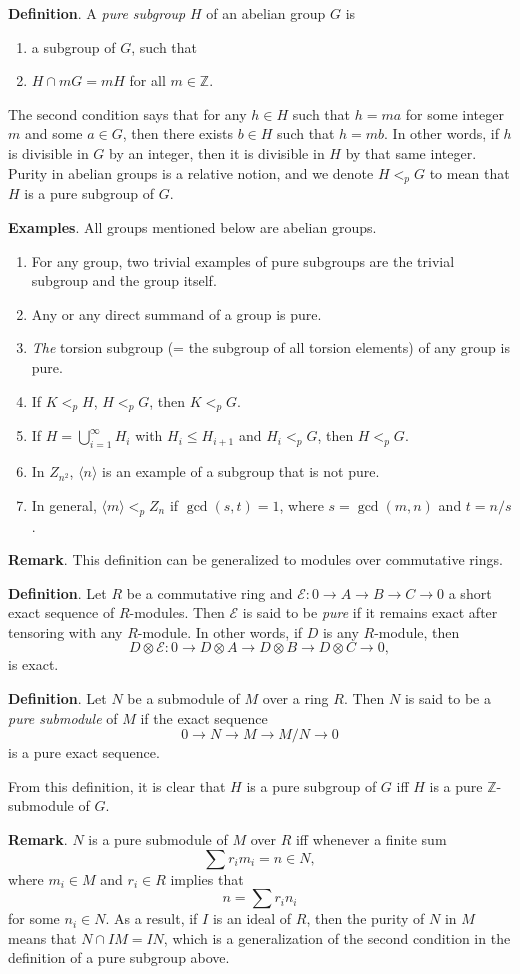 \documentclass[12pt]{article}
\begin{document}
\textbf{Definition}.  A \emph{pure subgroup} $H$ of an abelian group
$G$ is
\begin{enumerate}
\item a subgroup of $G$, such that
\item $H\cap mG=mH$ for all $m\in\mathbb{Z}$.
\end{enumerate}
The second condition says that for any $h\in H$ such that $h=ma$ for
some integer $m$ and some $a\in G$, then there exists $b\in H$ such
that $h=mb$.  In other words, if $h$ is divisible in $G$ by an
integer, then it is divisible in $H$ by that same integer.  Purity in
abelian groups is a relative notion, and we denote $H<_pG$ to mean
that $H$ is a pure subgroup of $G$.
\par
\textbf{Examples}.  All groups mentioned below are abelian groups.
\begin{enumerate}
\item For any group, two trivial examples of pure subgroups are the trivial
subgroup and the group itself.
\item Any  or any direct summand of a group is pure.
\item \textit{The} torsion subgroup (= the subgroup of all torsion elements) of any group is pure.
\item If $K<_pH$, $H<_pG$, then $K<_pG$.
\item If $H=\bigcup_{i=1}^{\infty}H_i$ with $H_i\leq H_{i+1}$ and
$H_i<_pG$, then $H<_pG$.
\item In $Z_{n^2}$, $\langle n \rangle$ is an example of a subgroup that is not
pure.
\item In general, $\langle m \rangle<_p Z_n$ if $\operatorname{gcd}(s,t)=1$,
where $s=\operatorname{gcd}(m,n)$ and $t=n/s$.
\end{enumerate}
\textbf{Remark}. This definition can be generalized to modules over
commutative rings.

\textbf{Definition}. Let $R$ be a commutative ring and
$\mathcal{E}\colon 0\rightarrow A\rightarrow B\rightarrow
C\rightarrow 0$ a short exact sequence of $R$-modules.  Then
$\mathcal{E}$ is said to be \emph{pure} if it remains exact after
tensoring with any $R$-module.  In other words, if $D$ is any
$R$-module, then
$$D\otimes\mathcal{E}\colon0\rightarrow D\otimes A\rightarrow D\otimes B\rightarrow D\otimes C\rightarrow
0,$$ is exact.

\textbf{Definition}. Let $N$ be a submodule of $M$ over a ring $R$.
Then $N$ is said to be a \emph{pure submodule} of $M$ if the exact
sequence $$0\rightarrow N\rightarrow M\rightarrow M/N\rightarrow 0$$
is a pure exact sequence.

From this definition, it is clear that $H$ is a pure subgroup of $G$
iff $H$ is a pure $\mathbb{Z}$-submodule of $G$.

\textbf{Remark}.  $N$ is a pure submodule of $M$ over $R$ iff
whenever a finite sum $$\sum r_im_i=n\in N,$$ where $m_i\in M$ and
$r_i\in R$ implies that $$n=\sum r_in_i$$ for some $n_i\in N$.  As a
result, if $I$ is an ideal of $R$, then the purity of $N$ in $M$ means
that $N\cap IM=IN$, which is a generalization of the second
condition in the definition of a pure subgroup above.
\end{document}
